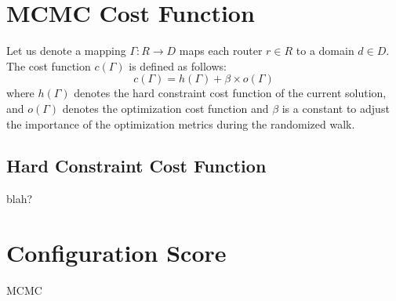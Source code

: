 \section{MCMC Cost Function}
Let us denote a mapping $\Gamma: R \rightarrow D$ maps each 
router $r \in R$ to a domain $d \in D$. The cost function 
$c(\Gamma)$ is defined as follows: 
\begin{equation}
	c(\Gamma) = h(\Gamma) + \beta \times o(\Gamma)
\end{equation}
where $h(\Gamma)$ denotes the hard constraint cost function 
of the current solution, and $o(\Gamma)$ denotes the optimization 
cost function and $\beta$ is a constant to adjust the importance of
the optimization metrics during the randomized walk. 

\subsection{Hard Constraint Cost Function}
blah?

\section{Configuration Score}

\begin{algorithm}[t]
	\caption{MCMC}
	\label{dcsyn}
	\begin{algorithmic}[1]
			\EndWhile
		\EndProcedure
		
		\If{}
		\EndIf
		\EndProcedure
	\end{algorithmic}
	
\end{algorithm}
